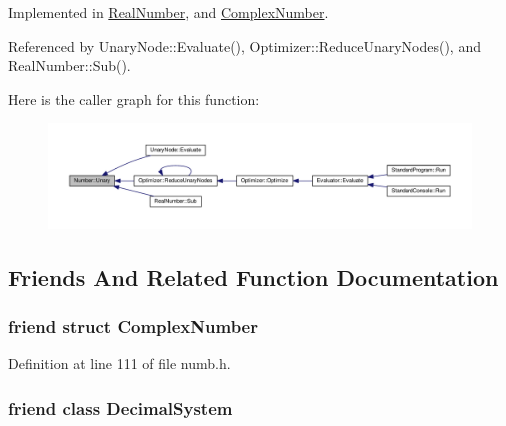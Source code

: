 Implemented in \hyperlink{structRealNumber_a0370c55b92e3ec36270a894918ae53ca}{Real\+Number}, and \hyperlink{structComplexNumber_a52bb791f848e90072a65841c7402b2c4}{Complex\+Number}.



Referenced by Unary\+Node\+::\+Evaluate(), Optimizer\+::\+Reduce\+Unary\+Nodes(), and Real\+Number\+::\+Sub().



Here is the caller graph for this function\+:\nopagebreak
\begin{figure}[H]
\begin{center}
\leavevmode
\includegraphics[width=350pt]{structNumber_a4283e401f772614fc566db78087cf860_icgraph}
\end{center}
\end{figure}




\subsection{Friends And Related Function Documentation}
\subsubsection[{\texorpdfstring{Complex\+Number}{ComplexNumber}}]{\setlength{\rightskip}{0pt plus 5cm}friend struct {\bf Complex\+Number}\hspace{0.3cm}{\ttfamily [friend]}}\hypertarget{structNumber_ae59451cc698db2f80a85244883578673}{}\label{structNumber_ae59451cc698db2f80a85244883578673}


Definition at line 111 of file numb.\+h.

\subsubsection[{\texorpdfstring{Decimal\+System}{DecimalSystem}}]{\setlength{\rightskip}{0pt plus 5cm}friend class {\bf Decimal\+System}\hspace{0.3cm}{\ttfamily [friend]}}\hypertarget{structNumber_a78cb487a959b6767c06f83cb19aafc43}{}\label{structNumber_a78cb487a959b6767c06f83cb19aafc43}


